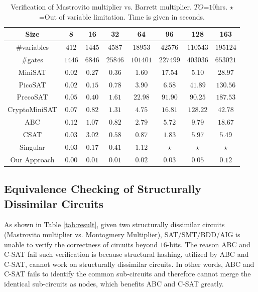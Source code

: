 \begin{table}[h!]
\begin{center}
\caption{Verification of Mastrovito multiplier vs. Barrett multiplier. $TO$=$10$hrs. $\star$=Out of variable limitation.
Time is given in seconds.}
\label{tab:bvsmas}
\begin{tabular}{|c||c|c|c|c|c|c|c|} \hline 
Size   			&8  		&16       	&32       	&64      	&96   		&128  		&163		\\
\hline 
\#variables 	&$412$ 		&$1445$ 	&$4587$ 	&$18953$ 	&$42576$ 	&$110543$ 	&$195124$ 	\\
\hline 
\#gates			&$1446$  	&$6846$    	&$25846$   	&$101401$    &$227499$  &$403036$  	&$653021$ 	\\
\hline
MiniSAT   		&$0.02$  	&$0.27$   	&$0.36$  	&$1.60$    	&$17.54$ 	&$5.10$ 	&$28.97$		\\
\hline
PicoSAT   		&$0.02$  	&$0.15$   	&$0.78$  	&$3.90$    	&$6.58$ 	&$41.89$ 	&$130.56$		\\
\hline
PrecoSAT   		&$0.05$  	&$0.40$   	&$1.61$  	&$22.98$   	&$91.90$ 	&$90.25$ 	&$187.53$		\\
\hline
CryptoMiniSAT	&$0.07$  	&$0.82$   	&$1.31$  	&$4.75$    	&$16.81$ 	&$128.22$ 	&$42.78$		\\
\hline
ABC   			&$0.12$  	&$1.07$   	&$0.82$  	&$2.79$    	&$5.72$ 	&$9.79$ 	&$18.67$	\\
\hline
CSAT   			&$0.03$  	&$3.02$   	&$0.58$  	&$0.87$   	&$1.83$ 	&$5.97$ 	&$5.49$		\\
\hline
Singular		&$0.03$  	&$0.17$   	&$0.41$  	&$1.12$   	&$\star$ 	&$\star$ 	&$\star$		\\
\hline
\hline
Our Approach	&$0.00$  	&$0.01$   	&$0.01$  	&$0.02$    &$0.03$  	&$0.05$  	&$0.12$ 	\\
\hline
\end{tabular}
\end{center}
\vspace{-0.2in}
\end{table}


\subsection{Equivalence Checking of Structurally Dissimilar Circuits}
As shown in Table \ref{tab:result}, given two structurally dissimilar circuits (Mastrovito multiplier vs. Montogmery Multiplier), 
SAT/SMT/BDD/AIG is unable to verify the correctness of circuits beyond $16$-bits. 
The reason ABC and C-SAT fail such verification is because structural hashing, utilized by ABC and C-SAT, cannot work on 
structurally dissimilar circuits. In other words, ABC and C-SAT fails to identify the common 
sub-circuits and therefore cannot merge the identical sub-circuits as nodes, which benefits ABC and C-SAT greatly.

